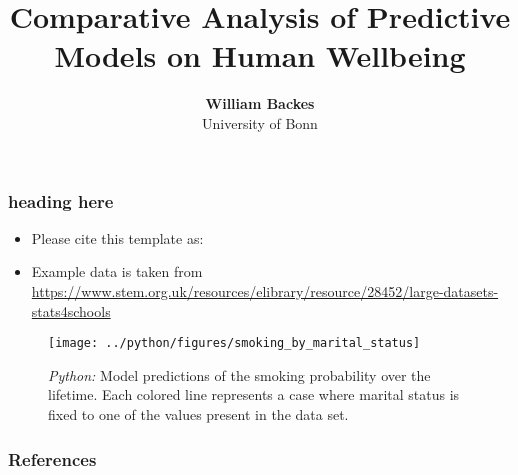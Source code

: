 \documentclass[11pt, aspectratio=169]{beamer}
\begin{document}
\title{Comparative Analysis of Predictive Models on Human Wellbeing}

\author[William Backes]
{
{\bf William Backes}\\
{\small University of Bonn}\\[1ex]
}


\begin{frame}
    \titlepage
    \note{~}
\end{frame}


\begin{frame}[t]
    \frametitle{heading here}
    \begin{itemize}
        \item<+-> Please cite this template as: \citet{GaudeckerEconProjectTemplates}
        \item<+-> Example data is taken from \url{https://www.stem.org.uk/resources/elibrary/resource/28452/large-datasets-stats4schools}
    \end{itemize}
    \note{~}
\end{frame}



\begin{frame}[t]
    \begin{figure}[H]

        \centering
        \texttt{[image: ../python/figures/smoking\_by\_marital\_status]}

        \caption{\emph{Python:} Model predictions of the smoking probability over the
            lifetime. Each colored line represents a case where marital status is fixed to
            one of the values present in the data set.}
        \label{fig:python-predictions}

    \end{figure}
\end{frame}






 {
    \begin{frame}
        \frametitle{}
    \end{frame}

}

\begin{frame}[allowframebreaks]
    \frametitle{References}
    \renewcommand{\bibfont}{\normalfont\footnotesize}
    \printbibliography
\end{frame}
\end{document}
